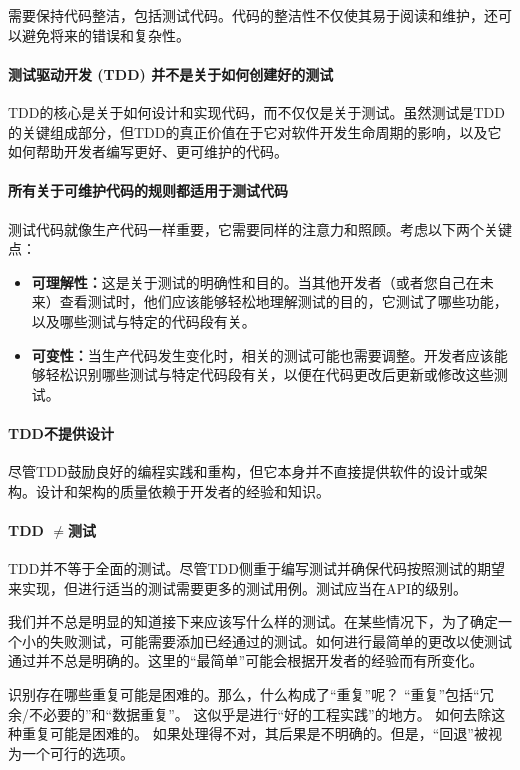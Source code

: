 需要保持代码整洁，包括测试代码。代码的整洁性不仅使其易于阅读和维护，还可以避免将来的错误和复杂性。

\paragraph{测试驱动开发 (TDD) 并不是关于如何创建好的测试}
TDD的核心是关于如何设计和实现代码，而不仅仅是关于测试。虽然测试是TDD的关键组成部分，但TDD的真正价值在于它对软件开发生命周期的影响，以及它如何帮助开发者编写更好、更可维护的代码。

\paragraph{所有关于可维护代码的规则都适用于测试代码}
测试代码就像生产代码一样重要，它需要同样的注意力和照顾。考虑以下两个关键点：

\begin{itemize}
	\item \textbf{可理解性：}这是关于测试的明确性和目的。当其他开发者（或者您自己在未来）查看测试时，他们应该能够轻松地理解测试的目的，它测试了哪些功能，以及哪些测试与特定的代码段有关。

	\item \textbf{可变性：}当生产代码发生变化时，相关的测试可能也需要调整。开发者应该能够轻松识别哪些测试与特定代码段有关，以便在代码更改后更新或修改这些测试。
\end{itemize}

\paragraph{TDD不提供设计}尽管TDD鼓励良好的编程实践和重构，但它本身并不直接提供软件的设计或架构。设计和架构的质量依赖于开发者的经验和知识。

\paragraph{TDD $\neq$测试}TDD并不等于全面的测试。尽管TDD侧重于编写测试并确保代码按照测试的期望来实现，但进行适当的测试需要更多的测试用例。测试应当在API的级别。

我们并不总是明显的知道接下来应该写什么样的测试。在某些情况下，为了确定一个小的失败测试，可能需要添加已经通过的测试。如何进行最简单的更改以使测试通过并不总是明确的。这里的“最简单”可能会根据开发者的经验而有所变化。

识别存在哪些重复可能是困难的。那么，什么构成了“重复”呢？
“重复”包括“冗余/不必要的”和“数据重复”。
这似乎是进行“好的工程实践”的地方。
如何去除这种重复可能是困难的。
如果处理得不对，其后果是不明确的。但是，“回退”被视为一个可行的选项。

